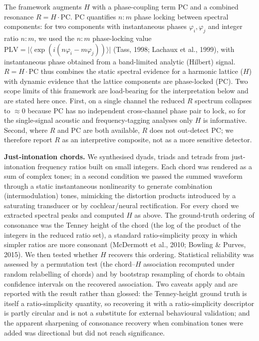 \documentclass[11pt]{article}
\begin{document}
The framework augments $H$ with a phase-coupling term $\mathrm{PC}$ and a combined resonance $R=H\cdot\mathrm{PC}$. $\mathrm{PC}$ quantifies $n{:}m$ phase locking between spectral components: for two components with instantaneous phases $\varphi_i,\varphi_j$ and integer ratio $n{:}m$, we used the $n{:}m$ phase-locking value $\mathrm{PLV}=\lvert\langle\exp(i(n\varphi_i-m\varphi_j))\rangle\rvert$ (Tass, 1998; Lachaux et al., 1999), with instantaneous phase obtained from a band-limited analytic (Hilbert) signal. $R=H\cdot\mathrm{PC}$ thus combines the static spectral evidence for a harmonic lattice ($H$) with dynamic evidence that the lattice components are phase-locked ($\mathrm{PC}$). Two scope limits of this framework are load-bearing for the interpretation below and are stated here once. First, on a single channel the reduced $R$ spectrum collapses to $\approx 0$ because $\mathrm{PC}$ has no independent cross-channel phase pair to lock, so for the single-signal acoustic and frequency-tagging analyses only $H$ is informative. Second, where $R$ and $\mathrm{PC}$ are both available, $R$ does not out-detect $\mathrm{PC}$; we therefore report $R$ as an interpretive composite, not as a more sensitive detector.

\textbf{Just-intonation chords.} We synthesised dyads, triads and tetrads from just-intonation frequency ratios built on small integers. Each chord was rendered as a sum of complex tones; in a second condition we passed the summed waveform through a static instantaneous nonlinearity to generate combination (intermodulation) tones, mimicking the distortion products introduced by a saturating transducer or by cochlear/neural rectification. For every chord we extracted spectral peaks and computed $H$ as above. The ground-truth ordering of consonance was the Tenney height of the chord (the log of the product of the integers in the reduced ratio set), a standard ratio-simplicity proxy in which simpler ratios are more consonant (McDermott et al., 2010; Bowling \& Purves, 2015). We then tested whether $H$ recovers this ordering. Statistical reliability was assessed by a permutation test (the chord–$H$ association recomputed under random relabelling of chords) and by bootstrap resampling of chords to obtain confidence intervals on the recovered association. Two caveats apply and are reported with the result rather than glossed: the Tenney-height ground truth is itself a ratio-simplicity quantity, so recovering it with a ratio-simplicity descriptor is partly circular and is not a substitute for external behavioural validation; and the apparent sharpening of consonance recovery when combination tones were added was directional but did not reach significance.
\end{document}
